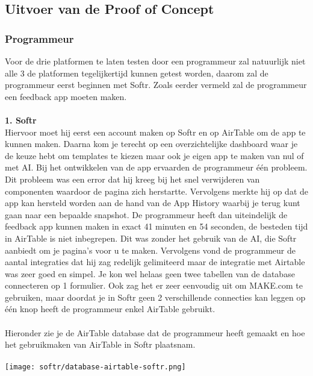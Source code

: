 \subsection{Uitvoer van de Proof of Concept}%
\label{subsec:uitvoer-proof-of-concept}

\subsubsection{Programmeur}%
\label{subsubsec:programmeur}
Voor de drie platformen te laten testen door een programmeur zal natuurlijk niet alle 3 de platformen tegelijkertijd 
kunnen getest worden, daarom zal de programmeur eerst beginnen met Softr. 
Zoals eerder vermeld zal de programmeur een feedback app moeten maken.
\\
\\
\textbf{1. Softr}
\\
Hiervoor moet hij eerst een account maken op Softr en op AirTable om de app te kunnen maken. 
Daarna kom je terecht op een overzichtelijke dashboard waar je de keuze hebt om templates te kiezen maar 
ook je eigen app te maken van nul of met AI. Bij het ontwikkelen van de app ervaarden de programmeur één probleem. 
Dit probleem was een error dat hij kreeg bij het snel verwijderen van componenten waardoor de pagina zich herstartte. 
Vervolgens merkte hij op dat de app kan hersteld worden aan de hand van de App History waarbij je terug kunt gaan 
naar een bepaalde snapshot. De programmeur heeft dan uiteindelijk de feedback app 
kunnen maken in exact 41 minuten en 54 seconden, de besteden tijd in AirTable is niet inbegrepen. 
Dit was zonder het gebruik van de AI, die Softr aanbiedt om je pagina’s voor u te maken. Vervolgens vond 
de programmeur de aantal integraties dat hij zag redelijk gelimiteerd maar de integratie met Airtable was 
zeer goed en simpel. Je kon wel helaas geen twee tabellen van de database connecteren op 1 formulier. 
Ook zag het er zeer eenvoudig uit om MAKE.com te gebruiken, maar doordat je in Softr geen 2 verschillende connecties 
kan leggen op één knop heeft de programmeur enkel AirTable gebruikt.
\\
\\
Hieronder zie je de AirTable database dat de programmeur heeft gemaakt en hoe het gebruikmaken van AirTable in Softr plaatsnam.
\\
\\
\texttt{[image: softr/database-airtable-softr.png]}
\\
\\
